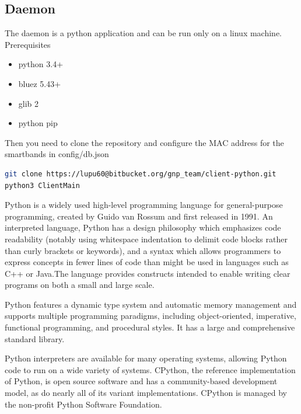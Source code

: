 \subsection{Daemon}
The daemon is a python application and can be run only on a linux machine.
Prerequisites
\begin{itemize}
	\item python 3.4+
    \item bluez 5.43+
	\item glib 2
	\item python pip
\end{itemize}
Then you need to clone the repository and configure the MAC address for the smartbands in config/db.json
\begin{lstlisting}[language=Bash]
git clone https://lupu60@bitbucket.org/gnp_team/client-python.git
python3 ClientMain
\end{lstlisting}
Python is a widely used high-level programming language for general-purpose programming, created by Guido van Rossum and first released in 1991. An interpreted language, Python has a design philosophy which emphasizes code readability (notably using whitespace indentation to delimit code blocks rather than curly brackets or keywords), and a syntax which allows programmers to express concepts in fewer lines of code than might be used in languages such as C++ or Java.The language provides constructs intended to enable writing clear programs on both a small and large scale.
\newline

Python features a dynamic type system and automatic memory management and supports multiple programming paradigms, including object-oriented, imperative, functional programming, and procedural styles. It has a large and comprehensive standard library.
\newline

Python interpreters are available for many operating systems, allowing Python code to run on a wide variety of systems. CPython, the reference implementation of Python, is open source software and has a community-based development model, as do nearly all of its variant implementations. CPython is managed by the non-profit Python Software Foundation.


